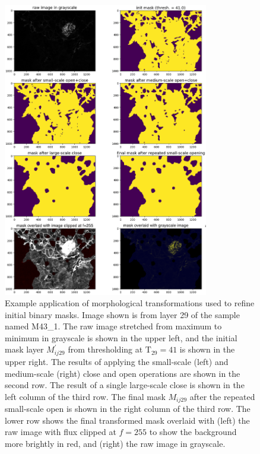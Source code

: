 \documentclass[letterpaper,11pt]{article}
\newcommand{\Tau}{\mathrm{T}}
\begin{document}
\begin{figure}[!ht]
\label{fig:mask_example_min}
\end{figure}

\begin{figure}[!ht]
\centering
\includegraphics[width=0.80\textwidth]{images/masking/image_6455_layer_29_masks}
\caption{\footnotesize Example application of morphological transformations used to refine initial binary masks. Image shown is from layer 29 of the sample named M43\_1. The raw image stretched from maximum to minimum in grayscale is shown in the upper left, and the initial mask layer $M^{\prime}_{ij29}$ from thresholding at $\Tau_{29}=41$ is shown in the upper right. The results of applying the small-scale (left) and medium-scale (right) close and open operations are shown in the second row. The result of a single large-scale close is shown in the left column of the third row. The final mask $M_{ij29}$ after the repeated small-scale open is shown in the right column of the third row. The lower row shows the final transformed mask overlaid with (left) the raw image with flux clipped at $f=255$ to show the background more brightly in red, and (right) the raw image in grayscale.}
\label{fig:mask_example_med}
\end{figure}
\end{document}
